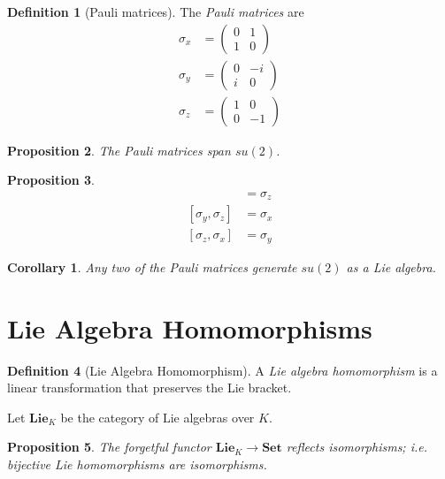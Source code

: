 \documentclass{book}
\newtheorem{prop}{Proposition}[chapter]
\newtheorem{cor}{Corollary}[prop]
\theoremstyle{definition}
\newtheorem{df}[prop]{Definition}
\newcommand{\Set}{\ensuremath{\mathbf{Set}}}
\begin{document}
\begin{df}[Pauli matrices]
The \emph{Pauli matrices} are
\begin{align*}
\sigma_x & = \left( \begin{array}{cc}
0 & 1 \\ 1 & 0
\end{array} \right) \\
\sigma_y & = \left( \begin{array}{cc}
0 & -i \\ i & 0
\end{array} \right) \\
\sigma_z & = \left( \begin{array}{cc}
1 & 0 \\ 0 & -1
\end{array} \right)
\end{align*}
\end{df}

\begin{prop}
The Pauli matrices span $su(2)$.
\end{prop}

\begin{prop}
\begin{align*}
[\sigma_x, \sigma_y] & = \sigma_z \\
[\sigma_y, \sigma_z] & = \sigma_x \\
[\sigma_z, \sigma_x] & = \sigma_y
\end{align*}
\end{prop}

\begin{cor}
Any two of the Pauli matrices generate $su(2)$ as a Lie algebra.
\end{cor}

\section{Lie Algebra Homomorphisms}

\begin{df}[Lie Algebra Homomorphism]
A \emph{Lie algebra homomorphism} is a linear transformation that preserves the Lie bracket.

Let $\mathbf{Lie}_K$ be the category of Lie algebras over $K$.
\end{df}

\begin{prop}
The forgetful functor $\mathbf{Lie}_K \rightarrow \Set$ reflects isomorphisms; i.e. bijective Lie homomorphisms are isomorphisms.
\end{prop}
\end{document}
